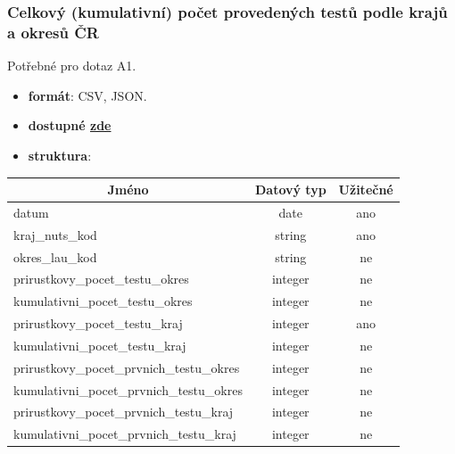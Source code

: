 \documentclass[12pt]{article}
\begin{document}
\subsubsection*{Celkový (kumulativní) počet provedených testů podle krajů a okresů ČR}
Potřebné pro dotaz A1.
\begin{itemize}
    \item \textbf{formát}: CSV, JSON.
    \item \textbf{dostupné  \href{https://onemocneni-aktualne.mzcr.cz/api/v2/covid-19/kraj-okres-testy.csv}{zde}}
    \item \textbf{struktura}:
\end{itemize}
        \begin{center}
            \begin{tabular}{ |l|c|c| }
                \hline
                \multicolumn{1}{|c|}{Jméno} & Datový typ & Užitečné \\
                \hline
                \hline
                datum & date & ano \\
                \hline
                kraj\_nuts\_kod & string & ano \\
                \hline
                okres\_lau\_kod & string & ne \\
                \hline
                prirustkovy\_pocet\_testu\_okres & integer & ne \\
                \hline
                kumulativni\_pocet\_testu\_okres & integer & ne \\
                \hline
                prirustkovy\_pocet\_testu\_kraj & integer & ano \\
                \hline
                kumulativni\_pocet\_testu\_kraj & integer & ne \\
                \hline
                prirustkovy\_pocet\_prvnich\_testu\_okres & integer & ne \\
                \hline
                kumulativni\_pocet\_prvnich\_testu\_okres & integer & ne \\
                \hline
                prirustkovy\_pocet\_prvnich\_testu\_kraj & integer & ne \\
                \hline
                kumulativni\_pocet\_prvnich\_testu\_kraj & integer & ne \\
                \hline
            \end{tabular}
        \end{center}
\end{document}
